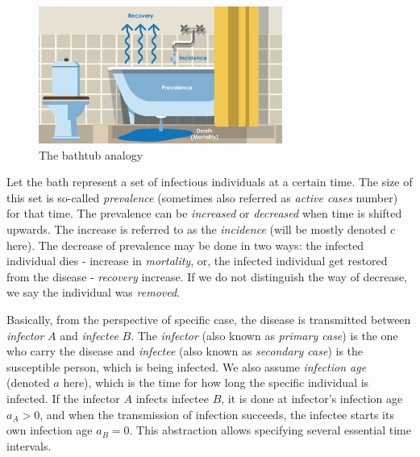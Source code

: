 \documentclass[
  digital, %
  oneside, %
  lof,     %
  lot,     %
]{fithesis4}
\begin{document}
\begin{figure}[h]
  \begin{center}
    \includegraphics[width=8cm]{static/images/epidemiologists-bathtub.png}
  \end{center}
  \caption{The bathtub analogy \cite{steward2020}}
  \label{fig:epidemiologists-bathtub}
\end{figure}

Let the bath represent a set of infectious individuals at a certain time.
The size of this set is so-called \textit{prevalence} (sometimes also referred as \textit{active cases} number) for that time.
The prevalence can be \textit{increased} or \textit{decreased} when time is shifted upwards.
The increase is referred to as the \textit{incidence} (will be mostly denoted $c$ here).
The decrease of prevalence may be done in two ways:
the infected individual dies - increase in \textit{mortality}, or, the infected individual get restored from the disease - \textit{recovery} increase.
If we do not distinguish the way of decrease, we say the individual was \textit{removed}.

Basically, from the perspective of specific case, the disease is transmitted between \textit{infector} $A$ and \textit{infectee} $B$.
The \textit{infector} (also known as \textit{primary case}) is the one who carry the disease and \textit{infectee} (also known as \textit{secondary case}) is the susceptible person, which is being infected.
We also assume \textit{infection age} (denoted $a$ here), which is the time for how long the specific individual is infected.
If the infector $A$ infects infectee $B$, it is done at infector's infection age $a_A > 0$, and when the transmission of infection succeeds, the infectee starts its own infection age $a_B = 0$.
This abstraction allows specifying several essential time intervals.
\end{document}
